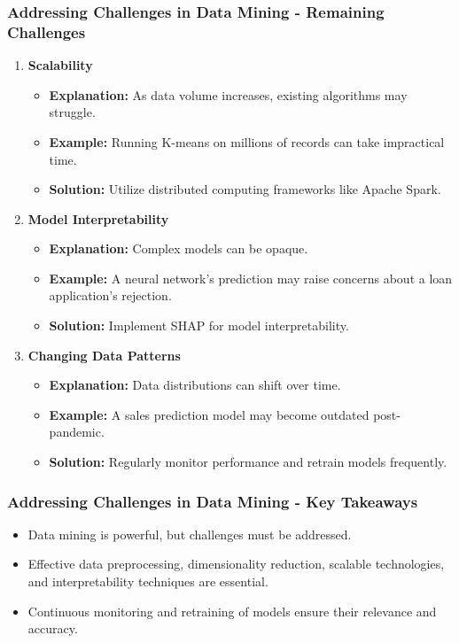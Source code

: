 \documentclass{beamer}
\begin{document}
\begin{frame}[fragile]
    \frametitle{Addressing Challenges in Data Mining - Remaining Challenges}
    \begin{enumerate}[resume]
        \item \textbf{Scalability}
        \begin{itemize}
            \item \textbf{Explanation:} As data volume increases, existing algorithms may struggle.
            \item \textbf{Example:} Running K-means on millions of records can take impractical time.
            \item \textbf{Solution:} Utilize distributed computing frameworks like Apache Spark.
        \end{itemize}
        
        \item \textbf{Model Interpretability}
        \begin{itemize}
            \item \textbf{Explanation:} Complex models can be opaque.
            \item \textbf{Example:} A neural network's prediction may raise concerns about a loan application's rejection.
            \item \textbf{Solution:} Implement SHAP for model interpretability.
        \end{itemize}
        
        \item \textbf{Changing Data Patterns}
        \begin{itemize}
            \item \textbf{Explanation:} Data distributions can shift over time.
            \item \textbf{Example:} A sales prediction model may become outdated post-pandemic.
            \item \textbf{Solution:} Regularly monitor performance and retrain models frequently.
        \end{itemize}
    \end{enumerate}
\end{frame}

\begin{frame}[fragile]
    \frametitle{Addressing Challenges in Data Mining - Key Takeaways}
    \begin{itemize}
        \item Data mining is powerful, but challenges must be addressed.
        \item Effective data preprocessing, dimensionality reduction, scalable technologies, and interpretability techniques are essential.
        \item Continuous monitoring and retraining of models ensure their relevance and accuracy.
    \end{itemize}
\end{frame}
\end{document}
